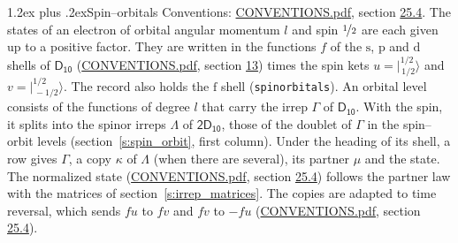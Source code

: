 \documentclass[10pt,a4paper]{article}
\makeatletter
\renewcommand\section{\@startsection{section}{1}{\z@}{-3ex plus -1ex minus -.2ex}%
  {1.2ex plus .2ex}{\normalfont\large\sffamily\bfseries\color{parttitle}}}
\numberwithin{equation}{section}
\newcommand{\grp}[1]{\mathsf{#1}}
\newcommand{\orbital}[1]{\mathrm{#1}}
\newcommand{\mult}{\kappa}
\newcommand{\intx}{\mu}
\newcommand{\jm}[2]{\bigl\lvert{}^{#1}_{\,#2}\bigr\rangle}
\makeatother
\begin{document}
\section{Spin--orbitals}\label{s:spin_orbitals}
Conventions: \href{../../CONVENTIONS.pdf}{CONVENTIONS.pdf}, section \href{../../CONVENTIONS.pdf\#conv.25.4}{25.4}.
\leavevmode\label{n:index.orbital.l}The states of an electron of orbital angular momentum $l$ and spin $\nicefrac{1}{2}$ are each given up to a positive factor. \label{n:local.spinor.uv}\label{n:local.function.f}They are written in the functions $f$ of the $\orbital{s}$, $\orbital{p}$ and $\orbital{d}$ shells of \href{../../../rotation/data/pdf/D10.pdf}{$\grp{D_{10}}$} (\href{../../CONVENTIONS.pdf}{CONVENTIONS.pdf}, section \href{../../../rotation/CONVENTIONS.pdf\#conv.13}{13}) times the spin kets $u = \jm{1/2}{1/2}$ and $v = \jm{1/2}{-1/2}$. The record also holds the $\orbital{f}$ shell (\texttt{spinorbitals}). An orbital level consists of the functions of degree $l$ that carry the irrep $\Gamma$ of \href{../../../rotation/data/pdf/D10.pdf}{$\grp{D_{10}}$}. With the spin, it splits into the spinor irreps $\Lambda$ of $\grp{2D_{10}}$, those of the doublet of $\Gamma$ in the spin--orbit levels (section~\ref{s:spin_orbit}, first column). \label{n:head.state}Under the heading of its shell, a row gives $\Gamma$, a copy $\mult$ of $\Lambda$ (when there are several), its partner $\intx$ and the state. The normalized state (\href{../../CONVENTIONS.pdf}{CONVENTIONS.pdf}, section \href{../../CONVENTIONS.pdf\#conv.25.4}{25.4}) follows the partner law with the matrices of section~\ref{s:irrep_matrices}. The copies are adapted to time reversal, which sends $f u$ to $f v$ and $f v$ to $-f u$ (\href{../../CONVENTIONS.pdf}{CONVENTIONS.pdf}, section \href{../../CONVENTIONS.pdf\#conv.25.4}{25.4}).
\end{document}
